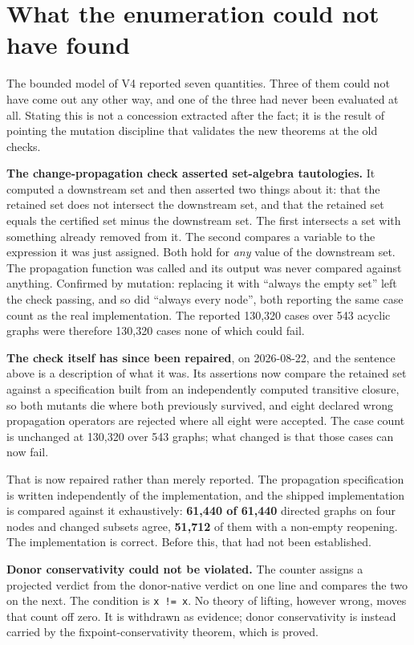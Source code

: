 \section{What the enumeration could not have found}

The bounded model of V4 reported seven quantities. Three of them could not have
come out any other way, and one of the three had never been evaluated at all.
Stating this is not a concession extracted after the fact; it is the result of
pointing the mutation discipline that validates the new theorems at the old
checks.

\textbf{The change-propagation check asserted set-algebra tautologies.} It computed a
downstream set and then asserted two things about it: that the retained set does
not intersect the downstream set, and that the retained set equals the certified
set minus the downstream set. The first intersects a set with something already
removed from it. The second compares a variable to the expression it was just
assigned. Both hold for \emph{any} value of the downstream set. The propagation
function was called and its output was never compared against anything.
Confirmed by mutation: replacing it with ``always the empty set'' left the check
passing, and so did ``always every node'', both reporting the same case count as
the real implementation. The reported 130,320 cases over 543 acyclic graphs were
therefore 130,320 cases none of which could fail.

\textbf{The check itself has since been repaired}, on 2026-08-22, and the sentence
above is a description of what it was. Its assertions now compare the retained
set against a specification built from an independently computed transitive
closure, so both mutants die where both previously survived, and eight declared
wrong propagation operators are rejected where all eight were accepted. The case
count is unchanged at 130,320 over 543 graphs; what changed is that those cases
can now fail.

That is now repaired rather than merely reported. The propagation
specification is written independently of the implementation, and the shipped
implementation is compared against it exhaustively: \textbf{61,440 of 61,440} directed
graphs on four nodes and changed subsets agree, \textbf{51,712} of them with a
non-empty reopening. The implementation is correct. Before this, that had not
been established.

\textbf{Donor conservativity could not be violated.} The counter assigns a projected
verdict from the donor-native verdict on one line and compares the two on the
next. The condition is \texttt{x != x}. No theory of lifting, however wrong, moves that
count off zero. It is withdrawn as evidence; donor conservativity is instead
carried by the fixpoint-conservativity theorem, which is proved.

